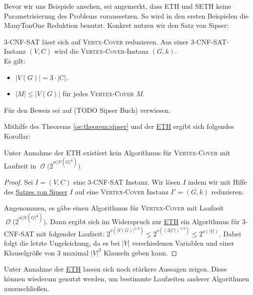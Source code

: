\documentclass[a4paper,ngerman]{atseminar}
\newcommand{\BigO}[1]{\ensuremath{\operatorname{\mathcal{O}}\bigl(#1\bigr)}\xspace}
\begin{document}
\noindent
Bevor wir uns Beispiele ansehen, sei angemerkt, dass ETH und SETH keine Parametrisierung des Problems voraussetzen. So wird in den ersten Beispielen die ManyTonOne Reduktion benutzt.
Konkret nutzen wir den Satz von Sipser:


\begin{theorem}
  \label{oe:theorem:sipser}
  \textsc{3-\textsc{CNF-SAT}} lässt sich auf \textsc{Vertx-Cover} reduzieren.
                Aus einer \textsc{3-\textsc{CNF-SAT}}-Instanz $(V, C)$ wird die \textsc{Vertex-Cover}-Instanz $(G, k)$.
                \\
                Es gilt:
                \begin{itemize}
                    \item $|V(G)| = 3 \cdot |C|$.
                    \item $|M| \leq |V(G)|$ für jedes \textsc{Vertex-Cover} $M$.
                \end{itemize}
\end{theorem}
Für den Beweis sei auf (TODO Sipser Buch) verwiesen.

\noindent
Mithilfe des Theorems \ref{oe:theorem:sipser} und der \hyperref[oe:definition:eth]{ETH} ergibt sich folgendes Korollar:

\begin{corollary}
  Unter Annahme der ETH existiert kein Algorithmus für \textsc{Vertex-Cover} mit Laufzeit in \BigO{2^{o(|V(G|^{\frac{1}{3}})}}.
\end{corollary}
\begin{proof}
  Sei $I = (V, C)$ eine 3-\textsc{CNF-SAT} Instanz. Wir lösen $I$ indem wir mit Hilfe des \hyperref[oe:theorem:sipser]{Satzes von Sipser}
  $I$ auf eine \textsc{Vertex-Cover} Instanz $I' = (G, k)$ reduzieren.

  \noindent
  Angenommen, es gäbe einen Algorithmus für \textsc{Vertex-Cover} mit Laufzeit \BigO{2^{o(|V(G|^{\frac{1}{3}})}}.
  Dann ergibt sich im Widerspruch zur \hyperref[oe:definition:eth]{ETH} ein Algorithmus für 3-\textsc{CNF-SAT} mit folgender Laufzeit:
  $2^{o(|V(G)|^{1/3})} \leq 2^{o((3|C|)^{1/3})} \leq 2^{o(|V|)}$.
  Dabei folgt die letzte Ungeleichung, da es bei $|V|$ verschiedenen Variablen und einer Klauselgröße von $3$ maximal $|V|^3$ Klauseln geben kann.
\end{proof}

\noindent
Unter Annahme der \hyperref[oe:definition:eth]{ETH} lassen sich noch stärkere Aussagen zeigen.
Diese können wiederum genutzt werden, um bestimmte Laufzeiten anderer Algorithmen auszuschließen.
\end{document}
